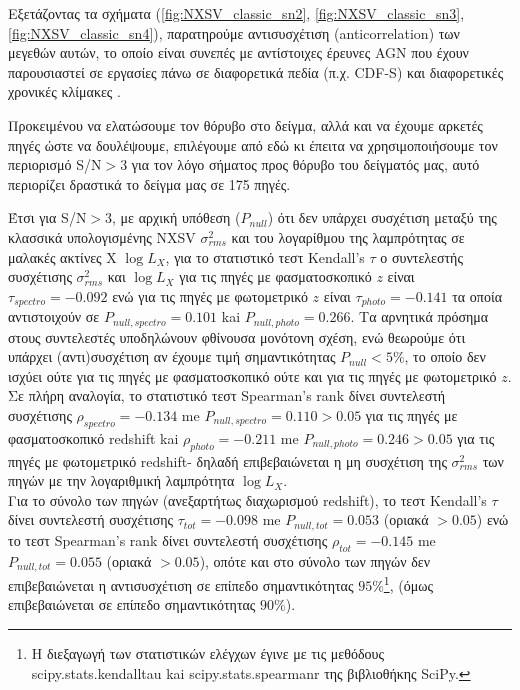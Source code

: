 Εξετάζοντας τα σχήματα (\ref{fig:NXSV_classic_sn2}, \ref{fig:NXSV_classic_sn3}, \ref{fig:NXSV_classic_sn4}), παρατηρούμε αντισυσχέτιση (\textlatin{anticorrelation}) των μεγεθών αυτών, το οποίο είναι συνεπές με αντίστοιχες έρευνες \textlatin{AGN} που έχουν παρουσιαστεί σε εργασίες πάνω σε διαφορετικά πεδία (π.χ. \textlatin{CDF-S}) και διαφορετικές χρονικές κλίμακες \cite{2017MNRAS.471.4398P}. 

Προκειμένου να ελατώσουμε τον θόρυβο στο δείγμα, αλλά και να έχουμε αρκετές πηγές ώστε να δουλέψουμε, επιλέγουμε από εδώ κι έπειτα να χρησιμοποιήσουμε τον περιορισμό \textlatin{S/N}$>3$ για τον λόγο σήματος προς θόρυβο του δείγματός μας, αυτό περιορίζει δραστικά το δείγμα μας σε 175 πηγές.

Έτσι για \textlatin{S/N}$>3$, με αρχική υπόθεση ($P_{null}$) ότι δεν υπάρχει συσχέτιση μεταξύ της κλασσικά υπολογισμένης \textlatin{NXSV} $\sigma_{rms}^2$ και του λογαρίθμου της λαμπρότητας σε μαλακές ακτίνες Χ $\log L_X$, για το στατιστικό τεστ \textlatin{Kendall's} $\tau$ ο συντελεστής συσχέτισης $\sigma_{rms}^2$ και $\log L_X$ για τις πηγές με φασματοσκοπικό $z$ είναι $\tau_{spectro} =-0.092$ ενώ για τις πηγές με φωτομετρικό $z$ είναι $\tau_{photo} = -0.141$ τα οποία αντιστοιχούν σε $P_{null, spectro} = 0.101$ kai $P_{null, photo} = 0.266$. Τα αρνητικά πρόσημα στους συντελεστές υποδηλώνουν φθίνουσα μονότονη σχέση, ενώ θεωρούμε ότι υπάρχει (αντι)συσχέτιση αν έχουμε τιμή σημαντικότητας $P_{null}<5\%$, το οποίο δεν ισχύει ούτε για τις πηγές με φασματοσκοπικό ούτε και για τις πηγές με φωτομετρικό $z$.
Σε πλήρη αναλογία, το στατιστικό τεστ \textlatin{Spearman's rank} δίνει συντελεστή συσχέτισης $\rho_{spectro} =-0.134$ me $P_{null, spectro} = 0.110>0.05$ για τις πηγές με φασματοσκοπικό \textlatin{redshift} kai $\rho_{photo} = -0.211$ me $P_{null, photo} =0.246>0.05$ για τις πηγές με φωτομετρικό \textlatin{redshift}- δηλαδή επιβεβαιώνεται η μη συσχέτιση της $\sigma_{rms}^2$ των πηγών με την λογαριθμική λαμπρότητα $\log L_X$. \\
Για το σύνολο των πηγών (ανεξαρτήτως διαχωρισμού \textlatin{redshift}), το τεστ \textlatin{Kendall's} $\tau$ δίνει συντελεστή συσχέτισης $\tau_{tot} = -0.098$ me $P_{null, tot}= 0.053 $ (οριακά $>0.05$) ενώ το τεστ \textlatin{Spearman's rank} δίνει συντελεστή συσχέτισης $\rho_{tot} = -0.145$ me $P_{null, tot} = 0.055$ (οριακά $>0.05$), οπότε και στο σύνολο των πηγών δεν επιβεβαιώνεται η αντισυσχέτιση σε επίπεδο σημαντικότητας $95\%$\footnote{Η διεξαγωγή των στατιστικών ελέγχων έγινε με τις μεθόδους \textlatin{scipy.stats.kendalltau} kai \textlatin{scipy.stats.spearmanr} της βιβλιοθήκης \textlatin{SciPy.}}, (όμως επιβεβαιώνεται σε επίπεδο σημαντικότητας $90\%$). \\
